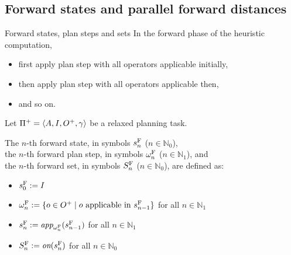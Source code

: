 \documentclass{gkibeamer}
\begin{document}
\subsection[Forward distances]{Forward states and parallel forward distances}

\begin{frame}{Forward states, plan steps and sets}
   In the forward phase of the heuristic computation,
  \begin{itemize}
  \item first apply plan step with \alert{all operators applicable
    initially},
  \item then apply plan step with \alert{all operators applicable
    then},
  \item and so on.
  \end{itemize}

  \begin{definition}
    Let ${\Pi}^+ = \langle A, I, {O}^+, \gamma\rangle$ be
    a relaxed planning task.

    \smallskip

    The \alert{$n$-th forward state}, in symbols \alert{$s^{\text
      F}_n$} ($n \in \mathbb N_0$), \\
    the \alert{$n$-th forward plan step}, in symbols
    \alert{$\omega^{\text F}_n$} ($n \in \mathbb N_1$), and \\
    the \alert{$n$-th forward set}, in symbols
    \alert{$S^{\text F}_n$} ($n \in \mathbb N_0$),
    are defined as:
    \begin{itemize}
    \item $s^{\text F}_0 := I$
    \item $\omega^{\text F}_n := \{ o \in {O}^+ \mid o
      \text{~applicable in~} s^{\text F}_{n-1}\}$ 
      for all $n \in \mathbb N_1$
    \item $s^{\text F}_n := \textit{app}_{\omega^{\text F}_n}(s^{\text
        F}_{n-1})$ for all $n \in \mathbb N_1$
    \item $S^{\text F}_n := \textit{on}(s^{\text F}_n)$ for all $n \in
      \mathbb N_0$
    \end{itemize}
  \end{definition}
\end{frame}
\end{document}
